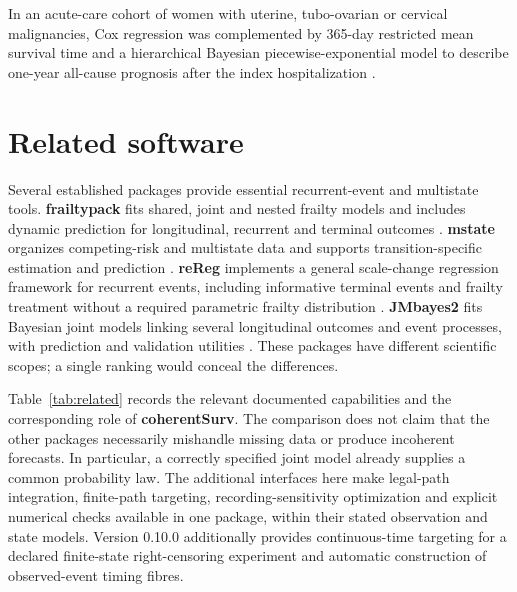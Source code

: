 \documentclass[article,nojss]{jss}
\newcommand{\pkg}[1]{\textbf{#1}}
\begin{document}
In an acute-care cohort of women with uterine, tubo-ovarian or cervical malignancies, Cox regression was complemented by 365-day restricted mean survival time and a hierarchical Bayesian piecewise-exponential model to describe one-year all-cause prognosis after the index hospitalization \citep{AdetunjiOyewusi2026}.

\section{Related software}\label{sec:related}
Several established packages provide essential recurrent-event and multistate tools. \pkg{frailtypack} fits shared, joint and nested frailty models and includes dynamic prediction for longitudinal, recurrent and terminal outcomes \citep{Rondeau2012,Krol2017}. \pkg{mstate} organizes competing-risk and multistate data and supports transition-specific estimation and prediction \citep{deWreede2011}. \pkg{reReg} implements a general scale-change regression framework for recurrent events, including informative terminal events and frailty treatment without a required parametric frailty distribution \citep{Chiou2023}. \pkg{JMbayes2} fits Bayesian joint models linking several longitudinal outcomes and event processes, with prediction and validation utilities \citep{JMbayes2}. These packages have different scientific scopes; a single ranking would conceal the differences.

Table~\ref{tab:related} records the relevant documented capabilities and the corresponding role of \pkg{coherentSurv}. The comparison does not claim that the other packages necessarily mishandle missing data or produce incoherent forecasts. In particular, a correctly specified joint model already supplies a common probability law. The additional interfaces here make legal-path integration, finite-path targeting, recording-sensitivity optimization and explicit numerical checks available in one package, within their stated observation and state models. Version 0.10.0 additionally provides continuous-time targeting for a declared finite-state right-censoring experiment and automatic construction of observed-event timing fibres.
\end{document}
